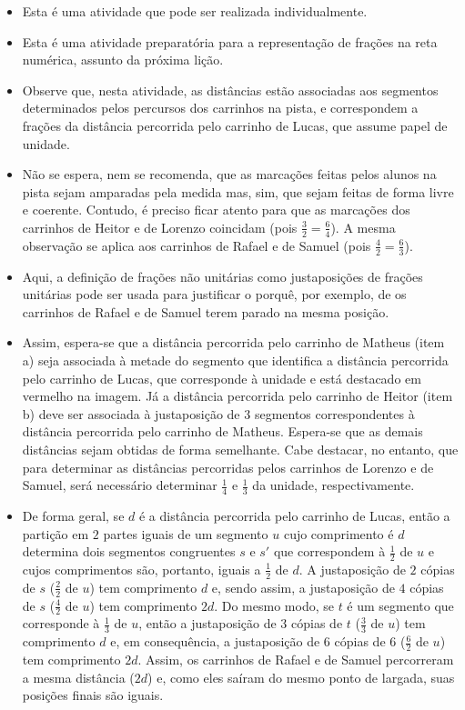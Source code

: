 \begin{multicols}{2}
\begin{orientacoes}
  \begin{itemize} %
    \item       Esta é uma atividade que pode ser realizada individualmente.
    \item       Esta é uma atividade preparatória para a representação de frações na reta numérica, assunto da próxima lição.
    \item       Observe que, nesta atividade, as distâncias estão associadas aos segmentos determinados pelos percursos dos carrinhos na pista, e correspondem a frações da distância percorrida pelo carrinho de Lucas, que assume papel de unidade.
    \item       Não se espera, nem se recomenda, que as marcações feitas pelos alunos na pista sejam amparadas pela medida mas, sim, que sejam feitas de forma livre e coerente. Contudo, é preciso ficar atento para que as marcações dos carrinhos de Heitor e de Lorenzo coincidam (pois       $\frac{3}{2} = \frac{6}{4}$). A mesma observação se aplica aos carrinhos de Rafael e de Samuel (pois       $\frac{4}{2} = \frac{6}{3}$).
    \item       Aqui, a definição de frações não unitárias como justaposições de frações unitárias pode ser usada para justificar o porquê, por exemplo, de os carrinhos de Rafael e de Samuel terem parado na mesma posição.
    \item       Assim, espera-se que a distância percorrida pelo carrinho de Matheus (item a) seja associada à metade do segmento que identifica a distância percorrida pelo carrinho de Lucas, que corresponde à unidade e está destacado em vermelho na imagem. Já a distância percorrida pelo carrinho de Heitor (item b) deve ser associada à justaposição de       $3$ segmentos correspondentes à distância percorrida pelo carrinho de Matheus. Espera-se que as demais distâncias sejam obtidas de forma semelhante. Cabe destacar, no entanto, que para determinar as distâncias percorridas pelos carrinhos de Lorenzo e de Samuel, será necessário determinar       $\frac{1}{4}$ e       $\frac{1}{3}$ da unidade, respectivamente.
    \item       De forma geral, se       $d$ é a distância percorrida pelo carrinho de Lucas, então a partição em       $2$ partes iguais de um segmento       $u$ cujo comprimento é       $d$ determina dois segmentos congruentes $s$ e $s'$ que correspondem à       $\frac{1}{2}$ de       $u$ e cujos comprimentos são, portanto, iguais a       $\frac{1}{2}$ de       $d$. A justaposição de       $2$ cópias de       $s$ ($\frac{2}{2}$ de       $u$) tem comprimento       $d$ e, sendo assim, a justaposição de       $4$ cópias de       $s$ ($\frac{4}{2}$ de $u$) tem comprimento       $2d$. Do mesmo modo, se       $t$ é um segmento que corresponde à       $\frac{1}{3}$ de       $u$, então a justaposição de       $3$ cópias de       $t$ ($\frac{3}{3}$ de       $u$) tem comprimento       $d$ e, em consequência, a justaposição de       $6$ cópias de       $6$ ($\frac{6}{2}$ de       $u$) tem comprimento       $2d$. Assim, os carrinhos de Rafael e de Samuel percorreram a mesma distância ($2d$) e, como eles saíram do mesmo ponto de largada, suas posições finais são iguais.

\end{itemize}
\end{orientacoes}
\end{multicols}
